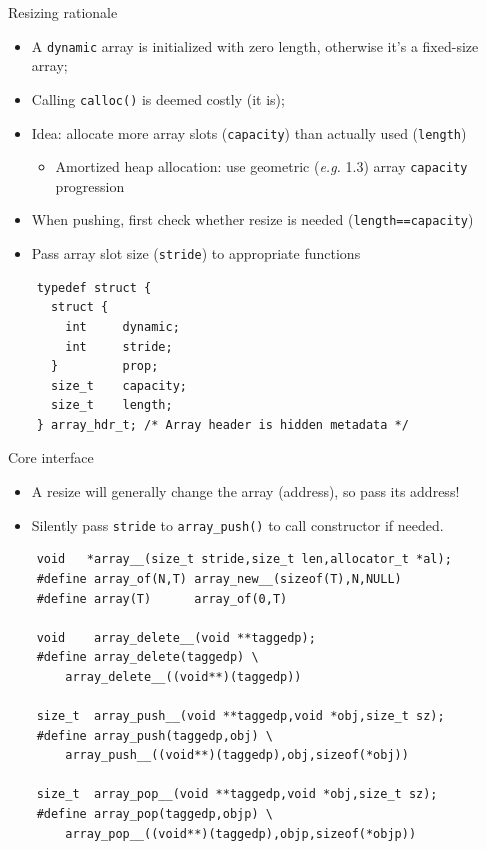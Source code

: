 \begin{frame}[fragile]{Resizing rationale}

  \begin{itemize}
  \item A \lstinline{dynamic} array is initialized with zero length, otherwise it's a fixed-size array;
  \item Calling \lstinline{calloc()} is deemed costly (it is);
  \item Idea: allocate more array slots (\lstinline{capacity}) than actually used (\lstinline{length})
    \begin{itemize}
    \item Amortized heap allocation: use geometric ({\em e.g.} 1.3) array \lstinline{capacity} progression
    \end{itemize}
  \item When pushing, first check whether resize is needed (\lstinline{length==capacity})
  \item Pass array slot size (\lstinline{stride}) to appropriate functions
  \end{itemize}

  \begin{lstlisting}
    typedef struct {
      struct {
        int     dynamic;
        int     stride;
      }         prop;
      size_t    capacity;
      size_t    length;
    } array_hdr_t; /* Array header is hidden metadata */
  \end{lstlisting}
  
\end{frame}


\begin{frame}[fragile]{Core interface}

  \begin{itemize}
  \item A resize will generally change the array (address), so pass its address!
  \item Silently pass \lstinline{stride} to \lstinline{array_push()} to call constructor if needed.
  \end{itemize}

  \begin{lstlisting}
    void   *array__(size_t stride,size_t len,allocator_t *al);
    #define array_of(N,T) array_new__(sizeof(T),N,NULL)
    #define array(T)      array_of(0,T)
    
    void    array_delete__(void **taggedp);
    #define array_delete(taggedp) \
        array_delete__((void**)(taggedp))
    
    size_t  array_push__(void **taggedp,void *obj,size_t sz);
    #define array_push(taggedp,obj) \
        array_push__((void**)(taggedp),obj,sizeof(*obj))

    size_t  array_pop__(void **taggedp,void *obj,size_t sz);
    #define array_pop(taggedp,objp) \
        array_pop__((void**)(taggedp),objp,sizeof(*objp))
  \end{lstlisting}

\end{frame}


